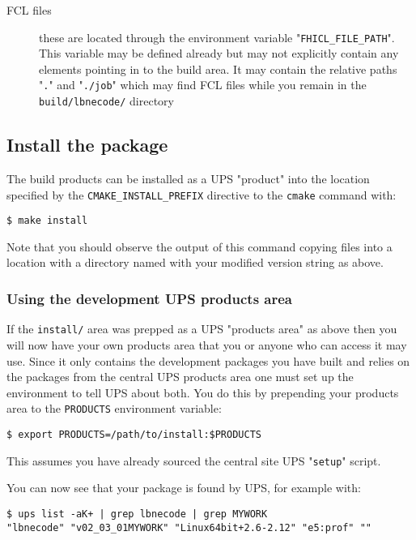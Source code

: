 \documentclass[11pt]{article}
\begin{document}
\begin{description}
\item[{FCL files}] these are located through the environment variable "\texttt{FHICL\_FILE\_PATH}".  This variable may be defined already but may not explicitly contain any elements pointing in to the build area.  It may contain the relative paths "\texttt{.}" and "\texttt{./job}" which may find FCL files while you remain in the \texttt{build/lbnecode/} directory
\end{description}
\subsection{Install the package}
\label{sec-1-6}

The build products can be installed as a UPS "product" into the location specified by  the \texttt{CMAKE\_INSTALL\_PREFIX} directive to the \texttt{cmake} command with:

\begin{verbatim}
$ make install
\end{verbatim}

Note that you should observe the output of this command copying files into a location with a directory named with your modified version string as above.

\subsubsection{Using the development UPS products area}
\label{sec-1-6-1}

If the \texttt{install/} area was prepped as a UPS "products area" as above then you will now have your own products area that you or anyone who can access it may use.  Since it only contains the development packages you have built and relies on the packages from the central UPS products area one must set up the environment to tell UPS about both.  You do this by prepending your products area to the \texttt{PRODUCTS} environment variable:

\begin{verbatim}
$ export PRODUCTS=/path/to/install:$PRODUCTS
\end{verbatim}

This assumes you have already sourced the central site UPS "\texttt{setup}" script.

You can now see that your package is found by UPS, for example with:

\begin{verbatim}
$ ups list -aK+ | grep lbnecode | grep MYWORK
"lbnecode" "v02_03_01MYWORK" "Linux64bit+2.6-2.12" "e5:prof" ""
\end{verbatim}
\end{document}
